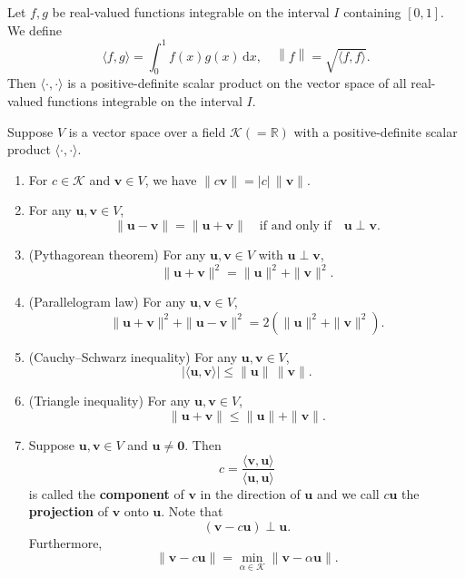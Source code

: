\documentclass{ctexart}
\begin{document}
	\begin{myex}
		Let $f,g$ be real-valued functions integrable on the interval $I$ containing $[0,1]$. We define
		\[
		\langle f, g \rangle = \int_0 ^1 f(x) g(x) \,\mathrm{d}x, \quad \left\| f \right\| = \sqrt{\langle f, f \rangle}.
		\]
		Then $\langle \cdot, \cdot \rangle$ is a positive-definite scalar product on the vector space of all real-valued functions integrable on the interval $I$.
	\end{myex}
	\begin{mypro}
		Suppose $V$ is a vector space over a field $\mathcal{K}\left( = \mathbb{R} \right)$ with a positive-definite scalar product $\langle \cdot, \cdot \rangle$.
		\begin{enumerate}
			\item For $c\in \mathcal{K}$ and $\mathbf{v} \in V$, we have $\| c \mathbf{v} \| = |c| \, \| \mathbf{v} \|$.
			\item For any $\mathbf{u}, \mathbf{v} \in V$,
			\[
			\| \mathbf{u}-\mathbf{v} \| = \| \mathbf{u}+\mathbf{v} \| \quad \text{if and only if} \quad \mathbf{u} \perp \mathbf{v}.
			\]
			\item (Pythagorean theorem) For any $\mathbf{u}, \mathbf{v} \in V$ with $\mathbf{u} \perp \mathbf{v}$,
			\[
			\| \mathbf{u} + \mathbf{v} \|^2 = \| \mathbf{u} \|^2 + \| \mathbf{v} \|^2.
			\]
			\item (Parallelogram law) For any $\mathbf{u}, \mathbf{v} \in V$,
			\[
			\| \mathbf{u} + \mathbf{v} \|^2 + \| \mathbf{u} - \mathbf{v} \|^2 = 2 \left( \| \mathbf{u} \|^2 + \| \mathbf{v} \|^2 \right).
			\]
			\item (Cauchy–Schwarz inequality) For any $\mathbf{u}, \mathbf{v} \in V$,
			\[
			|\langle \mathbf{u}, \mathbf{v} \rangle| \leq \| \mathbf{u} \| \, \| \mathbf{v} \|.
			\]
			\item (Triangle inequality) For any $\mathbf{u}, \mathbf{v} \in V$,
			\[
			\| \mathbf{u} + \mathbf{v} \| \leq \| \mathbf{u} \| + \| \mathbf{v} \|.
			\]
			\item Suppose $\mathbf{u}, \mathbf{v} \in V$ and $\mathbf{u} \neq \mathbf{0}$. Then
			\[
			c = \frac{\langle \mathbf{v}, \mathbf{u} \rangle}{\langle \mathbf{u}, \mathbf{u} \rangle}
			\]
			is called the \textbf{component} of $\mathbf{v}$ in the direction of $\mathbf{u}$ and we call $c \mathbf{u}$ the \textbf{projection} of $\mathbf{v}$ onto $\mathbf{u}$. Note that 
			\[
			\left( \mathbf{v} - c \mathbf{u} \right) \perp \mathbf{u}.
			\]
			Furthermore,
			\[
			\| \mathbf{v} - c \mathbf{u} \| = \min_{\alpha \in \mathcal{K}} \| \mathbf{v} - \alpha \mathbf{u} \|.
\]
\end{enumerate}
\end{mypro}
\end{document}

